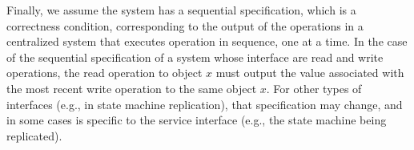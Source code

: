 \documentclass[journal,compsoc]{IEEEtran}
\begin{document}
Finally, we assume the system has a sequential specification, which is a correctness condition, corresponding to the output of the operations in a centralized system that executes operation in sequence, one at a time. In the case of the sequential specification of a system whose interface are read and write operations, the read operation to object $x$ must output the value associated with the most recent write operation to the same object $x$. For other types of interfaces (e.g., in state machine replication), that specification may change, and in some cases is specific to the service interface (e.g., the state machine being replicated).
\end{document}
